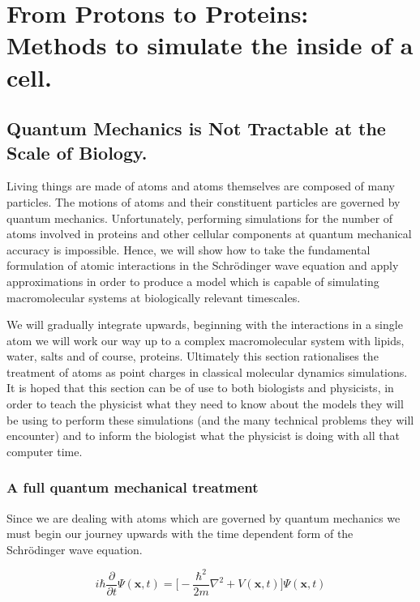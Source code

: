 \chapter{From Protons to Proteins: Methods to simulate the inside of a cell.}
\label{chap:methods}

\section{Quantum Mechanics is Not Tractable at the Scale of Biology.}
Living things are made of atoms and atoms themselves are composed of many particles. The motions of atoms and their constituent particles are governed by quantum mechanics. Unfortunately, performing simulations for the number of atoms involved in proteins and other cellular components at quantum mechanical accuracy is impossible. Hence, we will show how to take the fundamental formulation of atomic interactions in the Schr\"{o}dinger wave equation and apply approximations in order to produce a model which is capable of simulating macromolecular systems at biologically relevant timescales. 

We will gradually integrate upwards, beginning with the interactions in a single atom we will work our way up to a complex macromolecular system with lipids, water, salts and of course, proteins. Ultimately this section rationalises the treatment of atoms as point charges in classical molecular dynamics simulations. It is hoped that this section can be of use to both biologists and physicists, in order to teach the physicist what they need to know about the models they will be using to perform these simulations (and the many technical problems they will encounter) and to inform the biologist what the physicist is doing with all that computer time. 

\subsection{A full quantum mechanical treatment}
Since we are dealing with atoms which are governed by quantum mechanics we must begin our journey upwards with the time dependent form of the Schr\"{o}dinger wave equation. 

\begin{equation}
i\hbar \frac {\partial}{\partial t} \Psi (\textbf{x},t) = \big[ -\frac{\hbar ^2}{2m}\nabla^2 + V (\textbf{x}, t) \big] \Psi (\textbf{x},t) 
\label {schordinger_time_dependent}
\end{equation}


